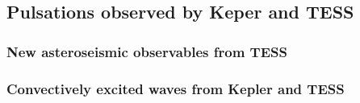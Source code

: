 {\color{blue}
\subsection{Pulsations observed by Keper and TESS}


\subsubsection{New asteroseismic observables from TESS}

\subsubsection{Convectively excited waves from Kepler and TESS}


}